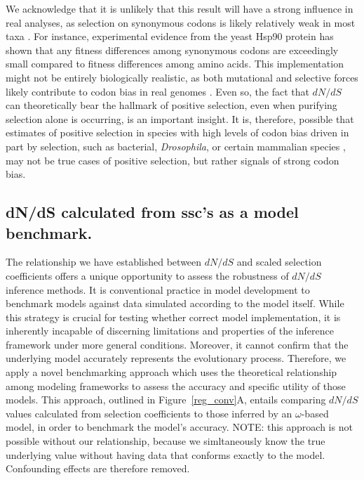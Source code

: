 \documentclass{pnastwo}
\begin{document}
\begin{article}
We acknowledge that it is unlikely that this result will have a strong influence in real analyses, as selection on synonymous codons is likely relatively weak in most taxa \cite{HershbergPetrov2008}. For instance, experimental evidence from the yeast Hsp90 protein has shown that any fitness differences among synonymous codons are exceedingly small compared to fitness differences among amino acids. This implementation might not be entirely biologically realistic, as both mutational and selective forces likely contribute to codon bias in real genomes \cite{Blumer1991, Duret2002, HershbergPetrov2008, Chen2009, PlotkinKudla2010}. Even so, the fact that $dN/dS$ can theoretically bear the hallmark of positive selection, even when purifying selection alone is occurring, is an important insight. It is, therefore, possible that estimates of positive selection in species with high levels of codon bias driven in part by selection, such as bacterial, \textit{Drosophila}, or certain mammalian species \cite{Duret2002, Chamaryetal2006, PlotkinKudla2010}, may not be true cases of positive selection, but rather signals of strong codon bias. 

\subsection*{dN/dS calculated from ssc's as a model benchmark.}

The relationship we have established between $dN/dS$ and scaled selection coefficients offers a unique opportunity to assess the robustness of $dN/dS$ inference methods. It is conventional practice in model development to benchmark models against data simulated according to the model itself. While this strategy is crucial for testing whether correct model implementation, it is inherently incapable of discerning limitations and properties of the inference framework under more general conditions. Moreover, it cannot confirm that the underlying model accurately represents the evolutionary process. Therefore, we apply a novel benchmarking approach which uses the theoretical relationship among modeling frameworks to assess the accuracy and specific utility of those models. This approach, outlined in Figure~\ref{reg_conv}A, entails comparing $dN/dS$ values calculated from selection coefficients to those inferred by an $\omega$-based model, in order to benchmark the model's accuracy. 
NOTE: this approach is not possible without our relationship, because we simltaneously know the true underlying value without having data that conforms exactly to the model. Confounding effects are therefore removed.


\end{article}
\end{document}
